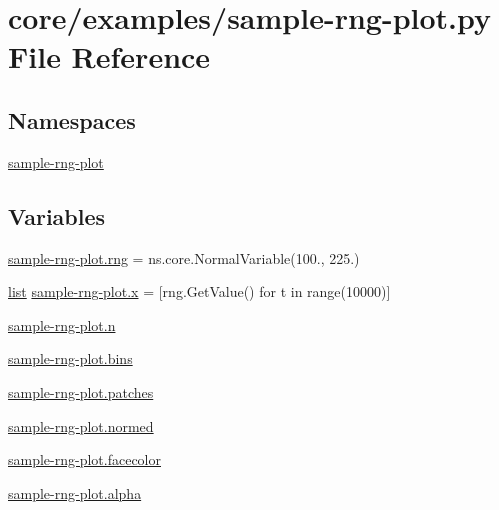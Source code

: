 \hypertarget{sample-rng-plot_8py}{}\section{core/examples/sample-\/rng-\/plot.py File Reference}
\label{sample-rng-plot_8py}
\subsection*{Namespaces}
\begin{DoxyCompactItemize}
\item 
 \hyperlink{namespacesample-rng-plot}{sample-\/rng-\/plot}
\end{DoxyCompactItemize}
\subsection*{Variables}
\begin{DoxyCompactItemize}
\item 
\hyperlink{namespacesample-rng-plot_a97a9861d8531a085e4641cd8dc918a97}{sample-\/rng-\/plot.\+rng} = ns.\+core.\+Normal\+Variable(100., 225.)
\item 
\hyperlink{openflow-interface_8h_afd9bcfa176617760671b67580f536fa7}{list} \hyperlink{namespacesample-rng-plot_a5b903688ba4a0e9d00ef4d0aa174b44f}{sample-\/rng-\/plot.\+x} = \mbox{[}rng.\+Get\+Value() for t in range(10000)\mbox{]}
\item 
\hyperlink{namespacesample-rng-plot_aeb5ee5c431e338ef39b7ac5431242e1d}{sample-\/rng-\/plot.\+n}
\item 
\hyperlink{namespacesample-rng-plot_afcecae1e5682ae7aedde08daab921fab}{sample-\/rng-\/plot.\+bins}
\item 
\hyperlink{namespacesample-rng-plot_a63a1f5d8c9682fac00db8975d54d67f4}{sample-\/rng-\/plot.\+patches}
\item 
\hyperlink{namespacesample-rng-plot_a1d39abb5d7087ddfc113c39d598e4c47}{sample-\/rng-\/plot.\+normed}
\item 
\hyperlink{namespacesample-rng-plot_aa920295f7cecf8ca823871e7b106fad0}{sample-\/rng-\/plot.\+facecolor}
\item 
\hyperlink{namespacesample-rng-plot_a2dbe7a25aeb215cb725a5f95b432e53d}{sample-\/rng-\/plot.\+alpha}
\end{DoxyCompactItemize}
